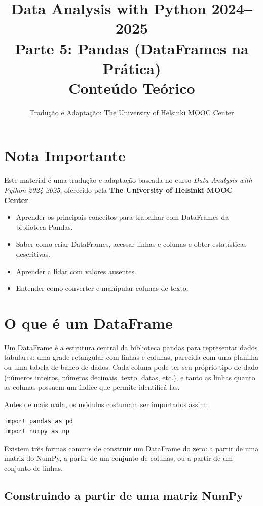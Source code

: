 \documentclass[11pt,a4paper]{article}
\title{\textbf{Data Analysis with Python 2024--2025}\\Parte 5: Pandas (DataFrames na Prática)\\\large Conteúdo Teórico}
\author{Tradução e Adaptação: The University of Helsinki MOOC Center}
\date{}
\begin{document}
\maketitle

\section*{Nota Importante}
Este material é uma tradução e adaptação baseada no curso \textit{Data Analysis with Python 2024-2025}, oferecido pela \textbf{The University of Helsinki MOOC Center}.

\begin{objetivos}
\begin{itemize}
    \item Aprender os principais conceitos para trabalhar com DataFrames da biblioteca Pandas.
    \item Saber como criar DataFrames, acessar linhas e colunas e obter estatísticas descritivas.
    \item Aprender a lidar com valores ausentes.
    \item Entender como converter e manipular colunas de texto.
\end{itemize}
\end{objetivos}

\tableofcontents
\newpage

\section{O que é um DataFrame}

Um DataFrame é a estrutura central da biblioteca pandas para representar dados tabulares: uma grade retangular com linhas e colunas, parecida com uma planilha ou uma tabela de banco de dados. Cada coluna pode ter seu próprio tipo de dado (números inteiros, números decimais, texto, datas, etc.), e tanto as linhas quanto as colunas possuem um índice que permite identificá-las.

Antes de mais nada, os módulos costumam ser importados assim:
\begin{lstlisting}
import pandas as pd
import numpy as np
\end{lstlisting}

Existem três formas comuns de construir um DataFrame do zero: a partir de uma matriz do NumPy, a partir de um conjunto de colunas, ou a partir de um conjunto de linhas.

\subsection{Construindo a partir de uma matriz NumPy}
\end{document}
